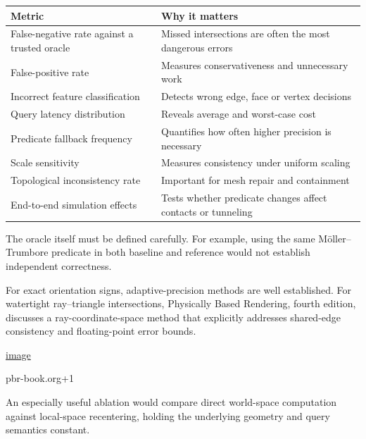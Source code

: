 {\def\LTcaptype{none} %
\begin{longtable}[]{@{}
  >{\raggedright\arraybackslash}p{}
  >{\raggedright\arraybackslash}p{}@{}}
\toprule\noalign{}
\begin{minipage}[b]{\linewidth}\raggedright
Metric
\end{minipage} & \begin{minipage}[b]{\linewidth}\raggedright
Why it matters
\end{minipage} \\
\midrule\noalign{}
\endhead
\bottomrule\noalign{}
\endlastfoot
False-negative rate against a trusted oracle & Missed intersections are often the most dangerous errors \\
False-positive rate & Measures conservativeness and unnecessary work \\
Incorrect feature classification & Detects wrong edge, face or vertex decisions \\
Query latency distribution & Reveals average and worst-case cost \\
Predicate fallback frequency & Quantifies how often higher precision is necessary \\
Scale sensitivity & Measures consistency under uniform scaling \\
Topological inconsistency rate & Important for mesh repair and containment \\
End-to-end simulation effects & Tests whether predicate changes affect contacts or tunneling \\
\end{longtable}
}

The oracle itself must be defined carefully. For example, using the same Möller--Trumbore predicate in both baseline and reference would not establish independent correctness.

For exact orientation signs, adaptive-precision methods are well established. For watertight ray--triangle intersections, Physically Based Rendering, fourth edition, discusses a ray-coordinate-space method that explicitly addresses shared-edge consistency and floating-point error bounds. 

\href{https://www.google.com/s2/favicons?domain=https://www.pbr-book.org&sz=32}{image}

pbr-book.org+1

An especially useful ablation would compare direct world-space computation against local-space recentering, holding the underlying geometry and query semantics constant.


